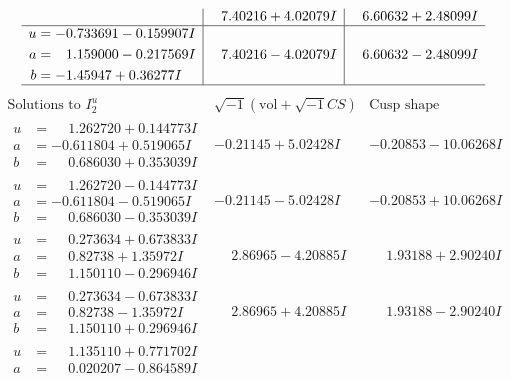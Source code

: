 \documentclass[1p]{elsarticle_modified}
\theoremstyle{definition}
\newcommand{\I}{\sqrt{-1}}
\begin{document}
$$\begin{array}{c|c|c}
 & \phantom{-}7.40216 + 4.02079 I & \phantom{-}6.60632 + 2.48099 I \\ \hline\begin{aligned}
u &= -0.733691 - 0.159907 I \\
a &= \phantom{-}1.159000 - 0.217569 I \\
b &= -1.45947 + 0.36277 I\end{aligned}
 & \phantom{-}7.40216 - 4.02079 I & \phantom{-}6.60632 - 2.48099 I\\
 \hline 
 \end{array}$$\newpage$$\begin{array}{c|c|c}  
\text{Solutions to }I^u_{2}& \I (\text{vol} + \sqrt{-1}CS) & \text{Cusp shape}\\
 \hline 
\begin{aligned}
u &= \phantom{-}1.262720 + 0.144773 I \\
a &= -0.611804 + 0.519065 I \\
b &= \phantom{-}0.686030 + 0.353039 I\end{aligned}
 & -0.21145 + 5.02428 I & -0.20853 - 10.06268 I \\ \hline\begin{aligned}
u &= \phantom{-}1.262720 - 0.144773 I \\
a &= -0.611804 - 0.519065 I \\
b &= \phantom{-}0.686030 - 0.353039 I\end{aligned}
 & -0.21145 - 5.02428 I & -0.20853 + 10.06268 I \\ \hline\begin{aligned}
u &= \phantom{-}0.273634 + 0.673833 I \\
a &= \phantom{-}0.82738 + 1.35972 I \\
b &= \phantom{-}1.150110 - 0.296946 I\end{aligned}
 & \phantom{-}2.86965 - 4.20885 I & \phantom{-}1.93188 + 2.90240 I \\ \hline\begin{aligned}
u &= \phantom{-}0.273634 - 0.673833 I \\
a &= \phantom{-}0.82738 - 1.35972 I \\
b &= \phantom{-}1.150110 + 0.296946 I\end{aligned}
 & \phantom{-}2.86965 + 4.20885 I & \phantom{-}1.93188 - 2.90240 I \\ \hline\begin{aligned}
u &= \phantom{-}1.135110 + 0.771702 I \\
a &= \phantom{-}0.020207 - 0.864589 I \\

\end{aligned}
\end{array}$$
\end{document}
